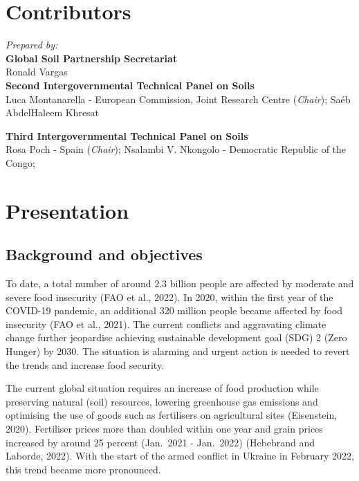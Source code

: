 \documentclass[
  10pt,
  b5paper,
  oneside]{book}
\begin{document}
\hypertarget{contributors}{%
\chapter*{Contributors}\label{contributors}}

\emph{Prepared by:}\\
\textbf{Global Soil Partnership Secretariat}\\
Ronald Vargas\\

\textbf{Second Intergovernmental Technical Panel on Soils}\\
Luca Montanarella - European Commission, Joint Research Centre
(\emph{Chair}); Saéb AbdelHaleem Khresat

\textbf{Third Intergovernmental Technical Panel on Soils}\\
Rosa Poch - Spain (\emph{Chair}); Nsalambi V. Nkongolo - Democratic Republic
of the Congo;

\mainmatter

\hypertarget{presentation}{%
\chapter{Presentation}\label{presentation}}

\hypertarget{background-and-objectives}{%
\section{Background and objectives}\label{background-and-objectives}}

To date, a total number of around 2.3 billion people are affected by moderate and severe food insecurity (FAO et al., 2022). In 2020, within the first year of the COVID-19 pandemic, an additional 320 million people became affected by food insecurity (FAO et al., 2021). The current conflicts and aggravating climate change further jeopardise achieving sustainable development goal (SDG) 2 (Zero Hunger) by 2030. The situation is alarming and urgent action is needed to revert the trends and increase food security.

The current global situation requires an increase of food production while preserving natural (soil) resources, lowering greenhouse gas emissions and optimising the use of goods such as fertilisers on agricultural sites (Eisenstein, 2020). Fertiliser prices more than doubled within one year and grain prices increased by around 25 percent (Jan.~2021 - Jan.~2022) (Hebebrand and Laborde, 2022). With the start of the armed conflict in Ukraine in February 2022, this trend became more pronounced.
\end{document}
